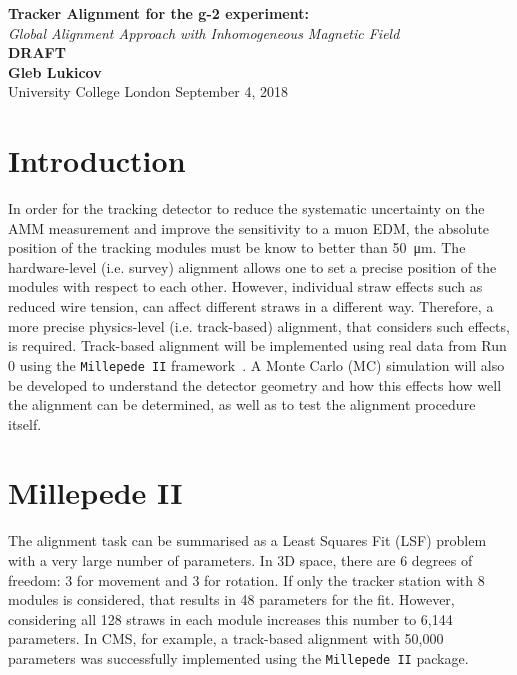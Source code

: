 \documentclass[a4paper,11pt]{article}
\begin{document}
\thispagestyle{empty}
\begin{titlepage}
\begin{center}
\end{center}
\begin{center}
	\vspace{1cm}
	{\huge \textbf{Tracker Alignment for the g-2 experiment:} \\ \textit{Global Alignment Approach with Inhomogeneous Magnetic Field} }\\
	\vspace{1.5cm}
	{\Huge \textbf{ DRAFT }}\\
	\vspace{6cm}
	{\LARGE\bf Gleb Lukicov}\\
	{\Large University College London}
	\vspace{4cm}
	\vfill
	\vspace{0.9cm}
	{\large September 4, 2018}
\end{center}
\end{titlepage}
\clearpage

\thispagestyle{plain}

\clearpage
\section{Introduction}
In order for the tracking detector to reduce the systematic uncertainty on the AMM measurement and improve the sensitivity to a muon EDM, the absolute position of the tracking modules must be know to better than \SI{50}{\micro\metre}. The hardware-level (i.e. survey) alignment allows one to set a precise position of the modules with respect to each other. However, individual straw effects such as reduced wire tension, can affect different straws in a different way. Therefore, a more precise physics-level (i.e. track-based) alignment, that considers such effects, is required. Track-based alignment will be implemented using real data from Run 0 using the \texttt{Millepede II} framework~\cite{mp2}. A Monte Carlo (MC) simulation will also be developed to understand the detector geometry and how this effects how well the alignment can be determined, as well as to test the alignment procedure itself. 

\section{Millepede II}
The alignment task can be summarised as a Least Squares Fit (LSF) problem with a very large number of parameters. In 3D space, there are 6 degrees of freedom: 3 for movement and 3 for rotation. If only the tracker station with 8 modules is considered, that results in 48 parameters for the fit. However, considering all 128 straws in each module increases this number to 6,144 parameters. In CMS, for example, a track-based alignment with 50,000 parameters was successfully implemented \cite{CMS} using the \texttt{Millepede II} package. 
\end{document}
